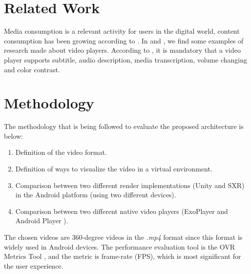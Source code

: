 \documentclass[runningheads]{llncs}
\begin{document}

\section{Related Work}


Media consumption is a relevant activity for users in the digital world, content consumption has been growing according to \cite{repo2004users}. In \cite{hu2018kalgan} and \cite{smolic2009overview}, we find some examples of research made about video players. According to \cite{wild2018inaccessibility}, it is mandatory that a video player supports subtitle, audio description, media transcription, volume changing and color contrast.

\section{Methodology}


The methodology that is being followed to evaluate the proposed architecture is below:

\begin{enumerate}
    \item Definition of the video format.
    \item Definition of ways to visualize the video in a virtual environment.
    \item Comparison between two different render implementations (Unity and SXR) in the Android platform (using two different devices).
    \item Comparison between two different native video players (ExoPlayer \cite{Exo} and Android Player \cite{AndroidVideoPlayer}).
\end{enumerate}

The chosen videos are 360-degree videos in the \textit{.mp4} format since this format is widely used in Android devices. The performance evaluation tool is the OVR Metrics Tool \cite{ovrmetrictool}, and the metric is frame-rate (FPS), which is most significant for the user experience.
\end{document}
